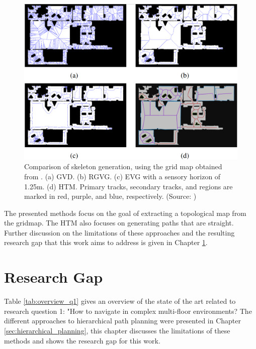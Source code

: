 \begin{figure}[h]
    \centering
    \includegraphics[width=\textwidth]{figures/20_state_of_the_art/htm_global_comparison.png}
    \caption[Comparison of generated topological maps]{Comparison of skeleton generation, using the grid map obtained from \cite{beeson_towards_2005}. (a) GVD. (b) RGVG. (c) EVG with a sensory horizon of 1.25m. (d) HTM. Primary tracks, secondary tracks, and regions are marked in red, purple, and blue, respectively. (Source: \cite{hou_straight_2021})}
    \label{fig:htm_global_comparison}
\end{figure}

The presented methods focus on the goal of extracting a topological map from the gridmap. The HTM also focuses on generating paths that are straight. Further discussion on the limitations of these approaches and the resulting research gap that this work aims to address is given in Chapter \ref{sec:research_gap}. 

\section{Research Gap}
\label{sec:research_gap}
Table \ref{tab:overview_q1} gives an overview of the state of the art related to research question 1: "How to navigate in complex multi-floor environments? The different approaches to hierarchical path planning were presented in Chapter \ref{sec:hierarchical_planning}, this chapter discusses the limitations of these methods and shows the research gap for this work.

